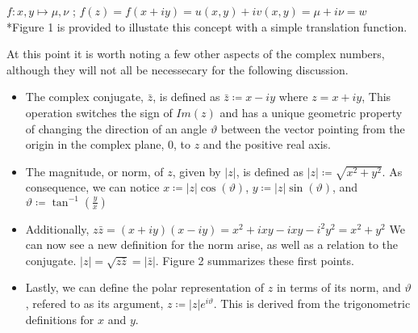 \documentclass[a4paper,man,natbib]{apa6}
\begin{document}
\begin{center}

      $ f : x,y \mapsto \mu,\nu $ ; $ f(z) = f(x+iy) = u(x,y) + iv(x,y) = \mu + i\nu = w $ \\
     *Figure 1 is provided to illustate this concept with a simple translation function.

\end{center}

At this point it is worth noting a few other aspects of the complex numbers, although they will not all be necessecary for the following discussion. 

\begin{itemize}

\item The complex conjugate, $ \bar{z} $, is defined as $ \bar{z} \coloneqq x - iy $ where $ z = x +iy $, 
This operation switches the sign of $ Im(z) $ and has a unique geometric property of changing the direction of an angle $ \vartheta $ 
between the vector pointing from the origin in the complex plane, 0, to $z$ and the positive real axis.

\item The magnitude, or norm, of $ z $, given by $ |z| $, is defined as $ |z| \coloneqq \sqrt{x^2 + y^2} $.
As consequence, we can notice $ x \coloneqq  |z|\cos(\vartheta) $, $ y \coloneqq  |z|\sin(\vartheta) $, and $ \vartheta \coloneqq  \tan^{-1}(\frac{y}{x}) $

\item Additionally, $ z\bar{z} = (x + iy)(x - iy) = x^2 +ixy - ixy - i^2y^2 = x^2 + y^2$  We can now see a new definition for the norm arise, as well as a relation to the conjugate.
$ |z| = \sqrt{z\bar{z}} = |\bar{z}| $. Figure 2 summarizes these first points.

\item Lastly, we can define the polar representation of $ z $ in terms of its norm, and $\vartheta$, refered to as its argument,  $ z \coloneqq  |z|e^{i\vartheta} $. This is derived from the trigonometric definitions for $ x $ and $ y $.  

\end{itemize}
\end{document}
